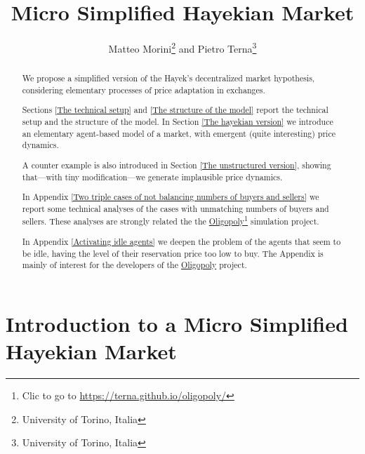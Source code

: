\documentclass[10pt]{report}
\title{Micro Simplified Hayekian Market}
\author{Matteo Morini\footnote{University of Torino, Italia} and Pietro Terna\footnote{University of Torino, Italia}}
\begin{document}
\maketitle
\thispagestyle{fancy}



\begin{abstract}
\thispagestyle{fancy}

We propose a simplified version of the Hayek's decentralized market hypothesis, considering elementary processes of price adaptation in exchanges.

Sections \ref{The technical setup} and \ref{The structure of the model} report the technical setup and the structure of the model. In Section \ref{The hayekian version} we introduce an elementary agent-based model of a market, with emergent (quite interesting)  price dynamics.

A counter example is also introduced in Section \ref{The unstructured version}, showing that---with tiny modification---we generate implausible price dynamics.

In Appendix \ref{Two triple cases of not balancing numbers of buyers and sellers} we report some technical analyses of the cases with unmatching numbers of buyers and sellers. These analyses are strongly related the the \href{https://terna.github.io/oligopoly/}{Oligopoly}\footnote{Clic to go to \url{https://terna.github.io/oligopoly/}} simulation project.

In Appendix \ref{Activating idle agents} we deepen the problem of the agents that seem to be idle, having the level of their reservation price too low to buy. The Appendix is mainly of interest for the developers of the \href{https://terna.github.io/oligopoly/}{Oligopoly} project.
\end{abstract}


\setcounter{page}{2}
\tableofcontents
\thispagestyle{fancy}


\listoffigures
\thispagestyle{fancy}
\setcounter{page}{2}




\chapter*{Introduction to a Micro Simplified Hayekian Market}
\label{micro Hayekian Market}
\thispagestyle{fancy}
%
\end{document}

